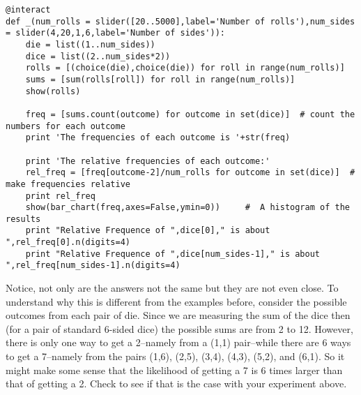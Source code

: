\documentclass[10pt,]{book}
\theoremstyle{plain}
\theoremstyle{definition}
\theoremstyle{definition}
\numberwithin{equation}{section}
\begin{document}
\begin{lstlisting}[style=sageinput]
@interact
def _(num_rolls = slider([20..5000],label='Number of rolls'),num_sides = slider(4,20,1,6,label='Number of sides')):
    die = list((1..num_sides))
    dice = list((2..num_sides*2))
    rolls = [(choice(die),choice(die)) for roll in range(num_rolls)]
    sums = [sum(rolls[roll]) for roll in range(num_rolls)]
    show(rolls)   

    freq = [sums.count(outcome) for outcome in set(dice)]  # count the numbers for each outcome
    print 'The frequencies of each outcome is '+str(freq)
    
    print 'The relative frequencies of each outcome:'
    rel_freq = [freq[outcome-2]/num_rolls for outcome in set(dice)]  # make frequencies relative
    print rel_freq        
    show(bar_chart(freq,axes=False,ymin=0))     #  A histogram of the results
    print "Relative Frequence of ",dice[0]," is about ",rel_freq[0].n(digits=4)
    print "Relative Frequence of ",dice[num_sides-1]," is about ",rel_freq[num_sides-1].n(digits=4)
\end{lstlisting}
\par
Notice, not only are the answers not the same but they are not even close. To understand why this 
	is different from the examples before, consider the possible outcomes from each pair of die. Since we
	are measuring the sum of the dice then (for a pair of standard 6-sided dice) the possible sums are from 
	2 to 12. However, there is only one way to get a 2--namely from a (1,1) pair--while there are 6 ways to get
	a 7--namely from the pairs (1,6), (2,5), (3,4), (4,3), (5,2), and (6,1). So it might make some sense
	that the likelihood of getting a 7 is 6 times larger than that of getting a 2. Check to see if that
	is the case with your experiment above.%
\typeout{************************************************}
\typeout{************************************************}
\end{document}
